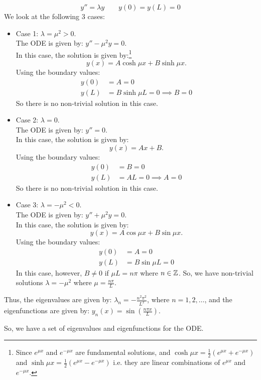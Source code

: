 \begin{eg}\label{eg:eigenvalprob}
	\[
	y'' = \lambda y \qquad y(0) = y(L) = 0
	\]
	We look at the following 3 cases:
	\begin{itemize}
		\item Case 1: $\lambda = \mu^2 > 0$.\\
		The ODE is given by: $y'' - \mu^2 y = 0$.\\
		In this case, the solution is given by:\footnote{Since $e^{\mu x}$ and $e^{-\mu x}$ are fundamental solutions, and $\cosh{\mu x} = \frac12(e^{\mu x} + e^{-\mu x})$ and $\sinh{\mu x} = \frac12(e^{\mu x} - e^{-\mu x})$ i.e. they are linear combinations of $e^{\mu x}$ and $e^{-\mu x}$.}
		\[
		y(x) = A \cosh{\mu x} + B \sinh{\mu x}.
		\]
		Using the boundary values:
		\begin{align*}
			y(0) &= A = 0 \\
			y(L) &= B \sinh{\mu L} = 0 \implies B=0
		\end{align*}
		So there is no non-trivial solution in this case.
		
		\item Case 2: $\lambda = 0$.\\
		The ODE is given by: $y''= 0$.\\
		In this case, the solution is given by:
		\[
		y(x) = Ax + B.
		\]
		Using the boundary values:
		\begin{align*}
			y(0) &= B = 0 \\
			y(L) &= AL = 0 \implies A = 0
		\end{align*}
		So there is no non-trivial solution in this case.
		
		\item Case 3: $\lambda = -\mu^2 < 0$.\\
		The ODE is given by: $y'' + \mu^2 y = 0$.\\
		In this case, the solution is given by:
		\[
		y(x) = A \cos{\mu x} + B \sin{\mu x}.
		\]
		Using the boundary values:
		\begin{align*}
			y(0) &= A = 0 \\
			y(L) &= B \sin{\mu L} = 0
		\end{align*}
		In this case, however, $B \neq 0$ if $\mu L = n \pi$ where $n \in \mathbb{Z}$. So, we have non-trivial solutions $\lambda = -\mu^2$ where $\mu = \frac{n \pi}{L}$.
	\end{itemize}
	Thus, the eigenvalues are given by: $\lambda_n = -\frac{n^2\pi^2}{L^2}$, where $n = 1, 2, \dots$, and the eigenfunctions are given by: $y_n(x) = \sin\left(\frac{n\pi x}{L}\right)$.
	
	So, we have a set of eigenvalues and eigenfunctions for the ODE.
\end{eg}

